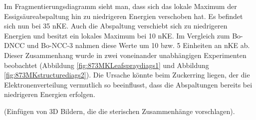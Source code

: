 Im Fragmentierungsdiagramm sieht man, dass sich das lokale Maximum der Essigsäureabspaltung hin zu niedrigeren Energien verschoben hat. Es befindet sich nun bei  35 \gls{nKE}. Auch die  Abspaltung verschiebt sich zu niedrigeren Energien und besitzt ein lokales Maximum bei 10 \gls{nKE}. Im Vergleich zum Bo-DNCC und Bo-NCC-3 nahmen diese Werte um 10 bzw. 5 Einheiten an \gls{nKE} ab. Dieser Zusammenhang wurde in zwei voneinander unabhängigen Experimenten beobachtet (Abbildung \ref{fig:873MKLeafspraydiags1} und Abbildung \ref{fig:873MKstructurediags2}). Die Ursache könnte beim Zuckerring liegen, der die Elektronenverteilung vermutlich so beeinflusst, dass die Abspaltungen bereits bei niedrigeren Energien erfolgen. 

(Einfügen von 3D Bildern, die die sterischen Zusammenhänge vorschlagen).


